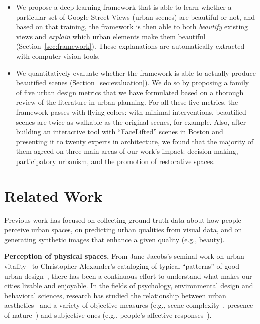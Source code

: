 \begin{itemize}
    \item We propose a deep learning framework that is able to learn whether a particular set of Google Street Views (urban scenes) are beautiful or not, and based on that training, the framework is then able to both \emph{beautify} existing views and \emph{explain} which urban elements  make them beautiful (Section~\ref{sec:framework}). These explanations are automatically extracted with computer vision tools. 
    
    \item We quantitatively evaluate whether the framework is able to actually produce beautified scenes (Section~\ref{sec:evaluation}). We do so by proposing a family of five urban design metrics that we have formulated based on a thorough review of the literature in urban planning. For all these five metrics, the framework passes with flying colors: with minimal interventions, beautified scenes are twice as walkable as the original scenes, for example. Also, after building an interactive tool with ``FaceLifted'' scenes in Boston and presenting it to twenty experts in architecture,  we found that the majority of them agreed on three main areas of our work's impact: decision making, participatory urbanism, and the promotion of restorative spaces.
\end{itemize}


\section{Related Work}
\label{sec:related}
Previous work has focused on collecting ground truth data about how people perceive urban spaces, on predicting urban qualities from visual data, and on generating synthetic images that enhance a given quality (e.g., beauty). 

\vspace{4pt}\noindent
\textbf{Perception of physical spaces.} From Jane Jacobs's seminal work on urban vitality~\cite{jacobs1961death} to Christopher Alexander's cataloging of typical ``patterns'' of good urban design~\cite{alexander1977pattern}, there has been a continuous effort to understand what makes our cities livable and enjoyable.  In the fields of psychology, environmental design and behavioral sciences, research has studied the relationship between urban aesthetics~\cite{real2000classification} and a variety of objective measures  (e.g.,  scene complexity~\cite{kaplan1972rated}, presence of nature~\cite{kaplan1989experience}) and subjective ones (e.g., people's affective responses~\cite{ulrich1983aesthetic}).  

